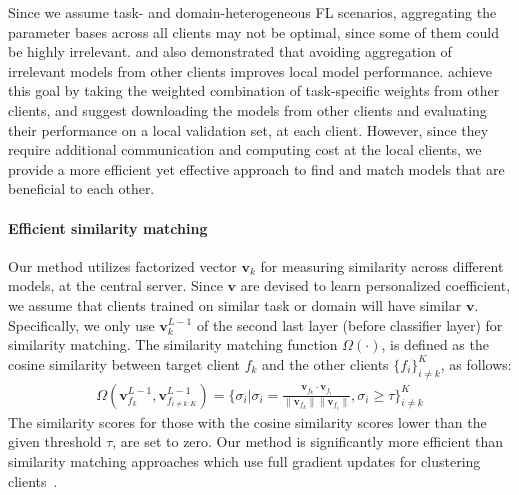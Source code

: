 


Since we assume task- and domain-heterogeneous FL scenarios, aggregating the parameter bases across all clients may not be optimal, since some of them could be highly irrelevant. \citet{yoon2021federated} and \citet{zhang2021personalized} also demonstrated that avoiding aggregation of irrelevant models from other clients improves local model performance. \citet{yoon2021federated} achieve this goal by taking the weighted combination of task-specific weights from other clients, and \citet{zhang2021personalized} suggest downloading the models from other clients and evaluating their performance on a local validation set, at each client. However, since they require additional communication and computing cost at the local clients, we provide a more efficient yet effective approach to find and match models that are beneficial to each other. 

\vspace{-0.1in}
\paragraph{Efficient similarity matching} Our method utilizes factorized vector $\textbf{v}_k$ for measuring similarity across different models, at the central server. Since $\textbf{v}$ are devised to learn personalized coefficient, we assume that clients trained on similar task or domain will have similar $\textbf{v}$. Specifically, we only use $\textbf{v}^{L-1}_{k}$ of the second last layer (before classifier layer) for similarity matching. The similarity matching function $\Omega(\cdot)$, is defined as the cosine similarity between target client $f_k$ and the other clients $\{f_i\}_{i\neq k}^K$, as follows:
\begin{equation}
\label{eq:sim}
\begin{split}
\Omega(\textbf{v}_{f_k}^{L-1}, \textbf{v}_{f_{i\neq k:K}}^{L-1}) = \{\sigma_i |  
\sigma_i = \frac{\textbf{v}_{f_k} \cdot \textbf{v}_{f_i}}{\|\textbf{v}_{f_k}\|\|\textbf{v}_{f_i}\|}
, \sigma_i \geq \tau \}_{i \neq k}^{K}
\end{split}
\end{equation}
The similarity scores for those with the cosine similarity scores lower than the given threshold $\tau$, are set to zero.
Our method is significantly more efficient than similarity matching approaches which use full gradient updates for clustering clients~\citep{sattler2019clustered,duan2021fedgroup}.

\vspace{-0.1in}
